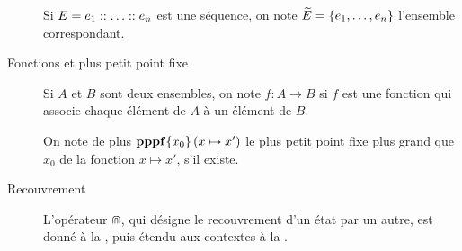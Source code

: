 \begin{description}
    Si $E = e_1 :: \ldots :: e_n$ est une séquence,
    on note $\widetilde{E} = \{ e_1, \ldots, e_n \}$ l'ensemble correspondant.
  
  \item[Fonctions et plus petit point fixe]
    Si $A$ et $B$ sont deux ensembles,
    on note $f : A \rightarrow B$
    si $f$ est une fonction qui associe chaque élément de $A$ à un élément de $B$.
    
    On note de plus $\mathbf{pppf}\{x_0\}\left(x\mapsto x'\right)$ le plus petit point fixe plus grand que $x_0$
    de la fonction $x \mapsto x'$, s'il existe.
  
  \item[Recouvrement]
    L'opérateur $\Cap$, qui désigne le recouvrement d'un état par un autre,
    est donné à la ,
    puis étendu aux contextes à la .
\end{description}

